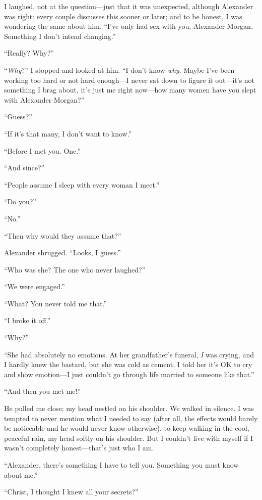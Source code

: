 I laughed, not at the question---just that it was unexpected, although
Alexander was right: every couple discusses this sooner or later; and to
be honest, I was wondering the same about him. ``I've only had sex with
you, Alexander Morgan. Something I don't intend changing.''

``Really? Why?''

``\emph{Why}?'' I stopped and looked at him. ``I don't know \emph{why}.
Maybe I've been working too hard or not hard enough---I never sat down
to figure it out---it's not something I brag about, it's just me right
now---how many women have you slept with Alexander Morgan?''

``Guess?''

``If it's that many, I don't want to know.''

``Before I met you. One.''

``And since?''

``People assume I sleep with every woman I meet.''

``Do you?''

``No.''

``Then why would they assume that?''

Alexander shrugged. ``Looks, I guess.''

``Who was she? The one who never laughed?''

``We were engaged.''

``What? You never told me that.''

``I broke it off.''

``Why?''

``She had absolutely no emotions. At her grandfather's funeral, \emph{I}
was crying, and I hardly knew the bastard, but she was cold as cement. I
told her it's OK to cry and show emotion---I just couldn't go through
life married to someone like that.''

``And then you met me!''

He pulled me close; my head nestled on his shoulder. We walked in
silence. I was tempted to never mention what I needed to say (after all,
the effects would barely be noticeable and he would never know
otherwise), to keep walking in the cool, peaceful rain, my head softly
on his shoulder. But I couldn't live with myself if I wasn't completely
honest---that's just who I am.

``Alexander, there's something I have to tell you. Something you must
know about me.''

``Christ, I thought I knew all your secrets?''


